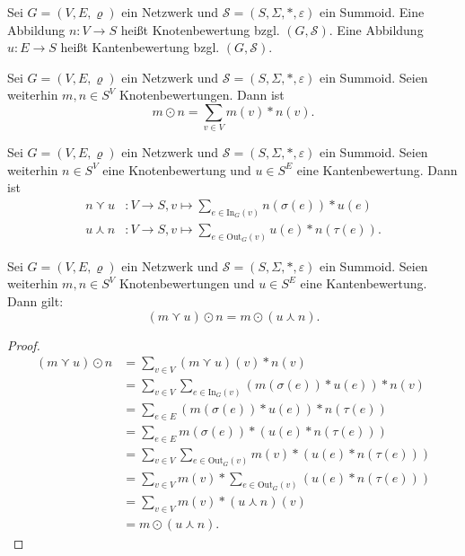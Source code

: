 \documentclass{article}
\begin{document}
\begin{definition}
  Sei $G = (V, E, \varrho)$ ein Netzwerk und
  $\mathcal{S} = (S, \Sigma, \ast, \varepsilon)$ ein Summoid.
  Eine Abbildung $n \colon V \to S$ heißt Knotenbewertung bzgl. $(G, \mathcal{S})$.
  Eine Abbildung $u \colon E \to S$ heißt Kantenbewertung bzgl. $(G, \mathcal{S})$.
\end{definition}

\begin{definition}
  Sei $G = (V, E, \varrho)$ ein Netzwerk und
  $\mathcal{S} = (S, \Sigma, \ast, \varepsilon)$ ein Summoid.
  Seien weiterhin $m, n \in S^V$ Knotenbewertungen.
  Dann ist
  \begin{equation*}
    m \odot n = \sum_{v \in V}m(v) \ast n(v).
   \end{equation*}  
\end{definition}

\begin{definition}
  Sei $G = (V, E, \varrho)$ ein Netzwerk und
  $\mathcal{S} = (S, \Sigma, \ast, \varepsilon)$ ein Summoid.
  Seien weiterhin $n \in S^V$ eine Knotenbewertung
  und $u \in S^E$ eine Kantenbewertung.
  Dann ist
  \begin{align*}
    n \curlyvee u &\colon V \to S, v \mapsto \sum_{e \in \text{In}_G(v)} n(\sigma(e)) \ast u(e) \\
    u \curlywedge n &\colon V \to S, v \mapsto \sum_{e \in \text{Out}_G(v)} u(e) \ast n(\tau(e)).
  \end{align*}
\end{definition}

\begin{theorem}\label{Theorem_KnotenKantenFaltung}
  Sei $G = (V, E, \varrho)$ ein Netzwerk und
  $\mathcal{S} = (S, \Sigma, \ast, \varepsilon)$ ein Summoid.
  Seien weiterhin $m, n \in S^V$ Knotenbewertungen und $u \in S^E$ eine Kantenbewertung.
  Dann gilt:
  \begin{equation*}
    (m \curlyvee u) \odot n = m \odot (u \curlywedge n).
  \end{equation*}
\end{theorem}
\begin{proof}
  \begin{align*}
    (m \curlyvee u) \odot n
    &= \sum_{v \in V}(m \curlyvee u)(v) \ast n(v) \\
    &= \sum_{v \in V}\sum_{e \in \text{In}_G(v)}(m(\sigma(e)) \ast u(e)) \ast n(v) \\
    &= \sum_{e \in E} (m(\sigma(e)) \ast u(e)) \ast n(\tau(e)) \\
    &= \sum_{e \in E} m(\sigma(e)) \ast (u(e) \ast n(\tau(e))) \\
    &= \sum_{v \in V}\sum_{e \in \text{Out}_G(v)} m(v) \ast (u(e) \ast n(\tau(e))) \\
    &= \sum_{v \in V} m(v) \ast \sum_{e \in \text{Out}_G(v)}(u(e) \ast n(\tau(e))) \\
    &= \sum_{v \in V} m(v) \ast (u \curlywedge n)(v) \\
    &= m \odot (u \curlywedge n).
  \end{align*}
\end{proof}
\end{document}
